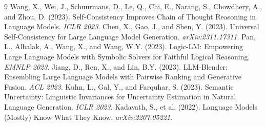\documentclass[11pt,a4paper]{article}
\begin{document}
\begin{thebibliography}{9}
 Wang, X., Wei, J., Schuurmans, D., Le, Q., Chi, E., Narang, S., Chowdhery, A., and Zhou, D. (2023). Self-Consistency Improves Chain of Thought Reasoning in Language Models. \textit{ICLR 2023}.
 Chen, X., Gao, J., and Shen, Y. (2023). Universal Self-Consistency for Large Language Model Generation. \textit{arXiv:2311.17311}.
 Pan, L., Albalak, A., Wang, X., and Wang, W.Y. (2023). Logic-LM: Empowering Large Language Models with Symbolic Solvers for Faithful Logical Reasoning. \textit{EMNLP 2023}.
 Jiang, D., Ren, X., and Lin, B.Y. (2023). LLM-Blender: Ensembling Large Language Models with Pairwise Ranking and Generative Fusion. \textit{ACL 2023}.
 Kuhn, L., Gal, Y., and Farquhar, S. (2023). Semantic Uncertainty: Linguistic Invariances for Uncertainty Estimation in Natural Language Generation. \textit{ICLR 2023}.
 Kadavath, S., et al. (2022). Language Models (Mostly) Know What They Know. \textit{arXiv:2207.05221}.
\end{thebibliography}
\end{document}
